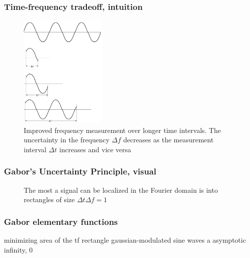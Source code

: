 \documentclass{beamer}
\begin{document}
\begin{frame}
	\frametitle{Time-frequency tradeoff, intuition}
	\begin{figure}
		\centering
		\includegraphics[height=5.5cm]{./gabor2.png}
		\caption{Improved frequency measurement over longer time intervals. The uncertainty in the frequency $\Delta f$ decreases as the measurement interval $\Delta t$ increases and vice versa}
	\end{figure}
\end{frame}

\begin{frame}
	\frametitle{Gabor's Uncertainty Principle, visual}
	\begin{figure}
		\centering
		\hspace{0.35em}
		\caption{The most a signal can be localized in the Fourier domain is into rectangles of size $\Delta t\Delta f = 1$}
	\end{figure}
\end{frame}

\begin{frame}
	\frametitle{Gabor elementary functions}
	minimizing area of the tf rectangle
	gaussian-modulated sine waves
	a asymptotic infinity, 0
\end{frame}
\end{document}
